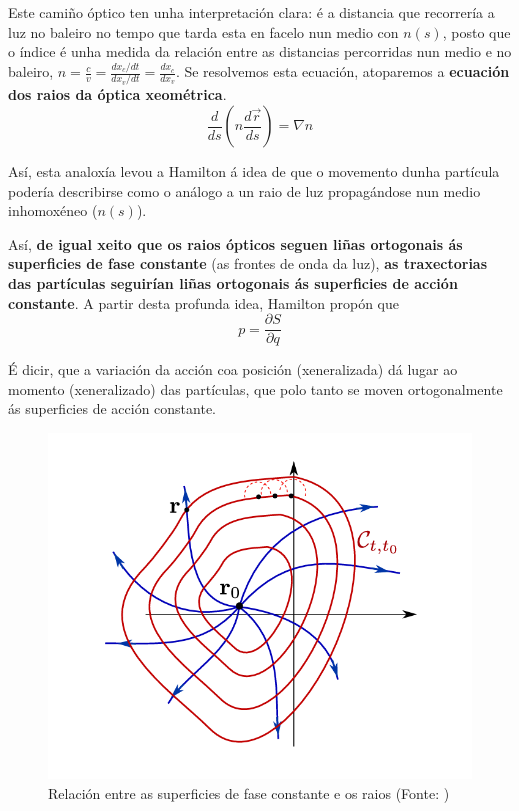 \begin{refsection}
\begin{multicols}{2}
\begin{itemize}
    Este camiño óptico ten unha interpretación clara: é a distancia que
recorrería a luz no baleiro no tempo que tarda esta en facelo nun medio con
$n(s)$, posto que o índice é unha medida da relación entre as distancias
percorridas nun medio e no baleiro, $n=\frac{c}{v} = \frac{dx_c/dt}{dx_v/dt} =
\frac{dx_c}{dx_v}$. Se resolvemos esta ecuación, atoparemos a \textbf{ecuación
dos raios da óptica xeométrica}.
    \begin{equation}
        \frac{d}{ds}(n\frac{d\vec{r}}{ds})=\nabla n
    \end{equation}

    Así, esta analoxía levou a Hamilton á idea de que o movemento dunha
partícula podería describirse como o análogo a un raio de luz propagándose nun
medio inhomoxéneo ($n(s)$).

    Así, \textbf{de igual xeito que os raios ópticos seguen liñas ortogonais ás
superficies de fase constante} (as frontes de onda da luz), \textbf{as
traxectorias das partículas seguirían liñas ortogonais ás superficies de acción
constante}. A partir desta profunda idea, Hamilton propón que
    \begin{equation}
        p=\frac{\partial S}{\partial q}
    \end{equation}

\end{itemize}

É dicir, que a variación da acción coa posición (xeneralizada) dá lugar ao
momento (xeneralizado) das partículas, que polo tanto se moven ortogonalmente
ás superficies de acción constante.

\begin{figure}[H]
   \centering
   \includegraphics[width=0.6\linewidth]{revistas/002/imaxes/hj1.png}
   \caption{Relación entre as superficies de fase constante e os raios (Fonte: \cite{bahramhouchmandzadeh_2020})}
\end{figure}


\end{multicols}
\end{refsection}
